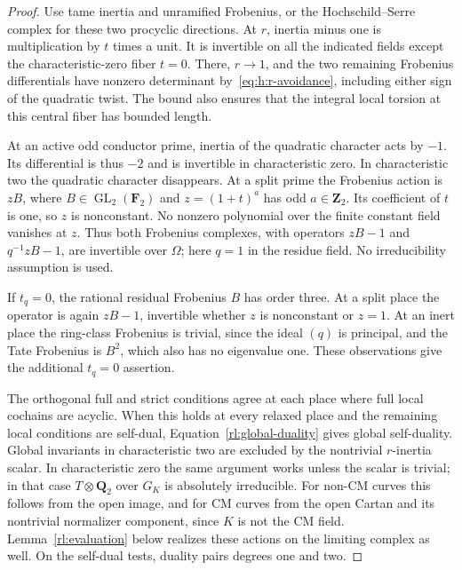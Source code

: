 \begin{proof}
Use tame inertia and unramified Frobenius, or the Hochschild--Serre
complex for these two procyclic directions.  At $r$, inertia minus one
is multiplication by $t$ times a unit.  It is invertible on all the
indicated fields except the characteristic-zero fiber $t=0$.  There,
$r\to1$, and the two remaining Frobenius differentials have nonzero
determinant by~\eqref{eq:h:r-avoidance}, including either sign of the
quadratic twist.  The bound also ensures that the integral local
torsion at this central fiber has bounded length.

At an active odd conductor prime, inertia of the quadratic character
acts by $-1$.  Its differential is thus $-2$ and is invertible in
characteristic zero.  In characteristic two the quadratic character
disappears.  At a split prime the Frobenius action is $zB$, where
$B\in\operatorname{GL}_2(\mathbf F_2)$ and
$z=(1+t)^a$ has odd $a\in\mathbf Z_2$.  Its coefficient of $t$ is one,
so $z$ is nonconstant.  No nonzero polynomial over the finite constant
field vanishes at $z$.  Thus both Frobenius complexes, with operators
$zB-1$ and $q^{-1}zB-1$, are invertible over $\Omega$; here $q=1$ in
the residue field.  No irreducibility assumption is used.

If $t_q=0$, the rational residual Frobenius $B$ has order three.
At a split place the operator is again $zB-1$, invertible whether
$z$ is nonconstant or $z=1$. At an inert place the ring-class
Frobenius is trivial, since the ideal $(q)$ is principal, and
the Tate Frobenius is $B^2$, which also has no eigenvalue one.
These observations give the additional $t_q=0$ assertion.

The orthogonal full and strict conditions agree at each place where
full local cochains are acyclic. When this holds at every relaxed
place and the remaining local conditions are self-dual,
Equation~\eqref{rl:global-duality} gives global self-duality.
Global invariants in characteristic two are excluded by the nontrivial
$r$-inertia scalar.  In characteristic zero the same argument works
unless the scalar is trivial; in that case $T\otimes\mathbf Q_2$ over
$G_K$ is absolutely irreducible.  For non-CM curves this follows from
the open image, and for CM curves from the open Cartan and its
nontrivial normalizer component, since $K$ is not the CM field.
Lemma~\ref{rl:evaluation} below realizes these actions on the limiting
complex as well. On the self-dual tests, duality pairs degrees
one and two.
\end{proof}

